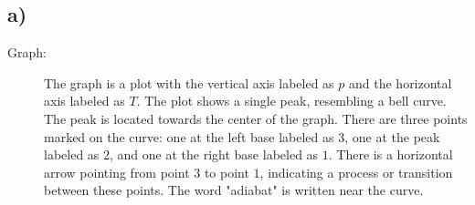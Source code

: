 

\subsection*{a)}

\begin{description}
    \item[Graph:] The graph is a plot with the vertical axis labeled as \( p \) and the horizontal axis labeled as \( T \). The plot shows a single peak, resembling a bell curve. The peak is located towards the center of the graph. There are three points marked on the curve: one at the left base labeled as \( 3 \), one at the peak labeled as \( 2 \), and one at the right base labeled as \( 1 \). There is a horizontal arrow pointing from point \( 3 \) to point \( 1 \), indicating a process or transition between these points. The word "adiabat" is written near the curve.
\end{description}
